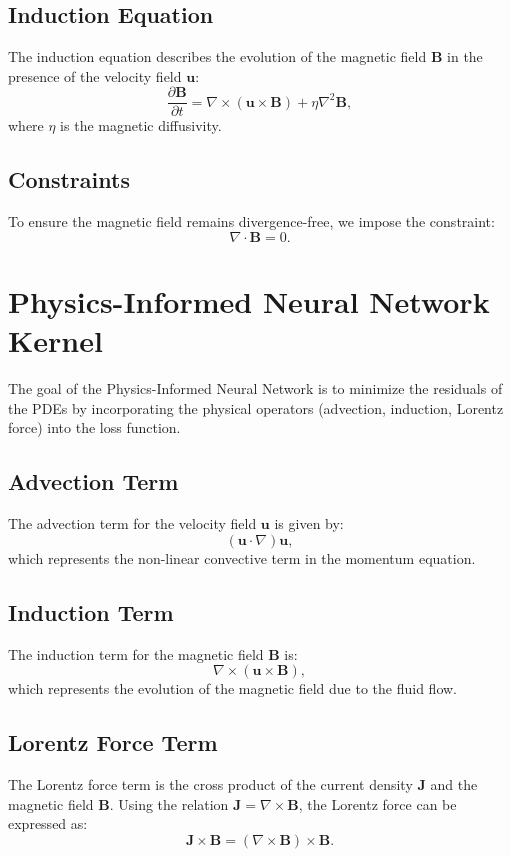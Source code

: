 \documentclass[12pt]{article}
\begin{document}
\subsection{Induction Equation}
The induction equation describes the evolution of the magnetic field \( \mathbf{B} \) in the presence of the velocity field \( \mathbf{u} \):
\begin{equation}
\frac{\partial \mathbf{B}}{\partial t} = \nabla \times (\mathbf{u} \times \mathbf{B}) + \eta \nabla^2 \mathbf{B},
\end{equation}
where \( \eta \) is the magnetic diffusivity.

\subsection{Constraints}
To ensure the magnetic field remains divergence-free, we impose the constraint:
\begin{equation}
\nabla \cdot \mathbf{B} = 0.
\end{equation}

\section{Physics-Informed Neural Network Kernel}
The goal of the Physics-Informed Neural Network is to minimize the residuals of the PDEs by incorporating the physical operators (advection, induction, Lorentz force) into the loss function.

\subsection{Advection Term}
The advection term for the velocity field \( \mathbf{u} \) is given by:
\begin{equation}
(\mathbf{u} \cdot \nabla) \mathbf{u},
\end{equation}
which represents the non-linear convective term in the momentum equation.

\subsection{Induction Term}
The induction term for the magnetic field \( \mathbf{B} \) is:
\begin{equation}
\nabla \times (\mathbf{u} \times \mathbf{B}),
\end{equation}
which represents the evolution of the magnetic field due to the fluid flow.

\subsection{Lorentz Force Term}
The Lorentz force term is the cross product of the current density \( \mathbf{J} \) and the magnetic field \( \mathbf{B} \). Using the relation \( \mathbf{J} = \nabla \times \mathbf{B} \), the Lorentz force can be expressed as:
\begin{equation}
\mathbf{J} \times \mathbf{B} = (\nabla \times \mathbf{B}) \times \mathbf{B}.
\end{equation}
\end{document}
